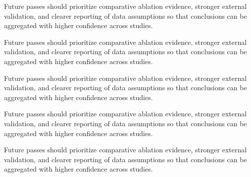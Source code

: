 \documentclass[11pt]{article}
\begin{document}
Future passes should prioritize comparative ablation evidence, stronger external validation, and clearer reporting of data assumptions so that conclusions can be aggregated with higher confidence across studies.

Future passes should prioritize comparative ablation evidence, stronger external validation, and clearer reporting of data assumptions so that conclusions can be aggregated with higher confidence across studies.

Future passes should prioritize comparative ablation evidence, stronger external validation, and clearer reporting of data assumptions so that conclusions can be aggregated with higher confidence across studies.

Future passes should prioritize comparative ablation evidence, stronger external validation, and clearer reporting of data assumptions so that conclusions can be aggregated with higher confidence across studies.

Future passes should prioritize comparative ablation evidence, stronger external validation, and clearer reporting of data assumptions so that conclusions can be aggregated with higher confidence across studies.



\end{document}
